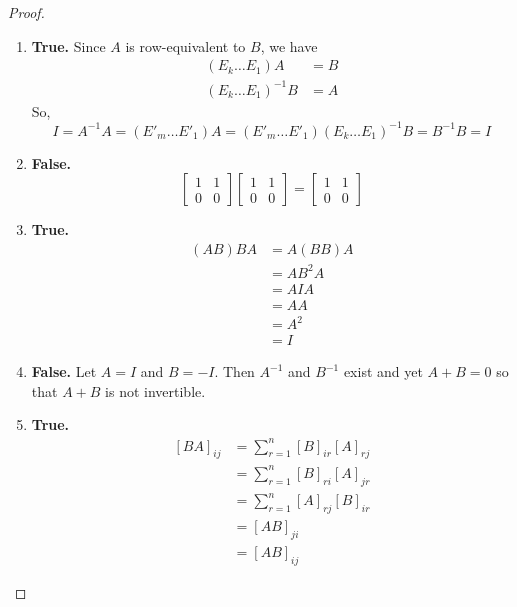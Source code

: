 \begin{exercise}
    \begin{proof}
        \begin{enumerate}
            \item \textbf{True.} Since \( A \) is row-equivalent to \( B \), we have
            \begin{align*}
                (E_k \ldots E_1)A &= B \\
                (E_k \ldots E_1)^{-1}B &= A
            \end{align*}
            So,
            \[ I = A^{-1}A = (E'_m \ldots E'_1)A = (E'_m \ldots E'_1)(E_k \ldots E_1)^{-1}B = B^{-1}B = I \]
            
            \item \textbf{False.}
            \[ \begin{bmatrix} 1 & 1 \\ 0 & 0 \end{bmatrix} \begin{bmatrix} 1 & 1 \\ 0 & 0 \end{bmatrix} = \begin{bmatrix} 1 & 1 \\ 0 & 0 \end{bmatrix}\]
            
            \item \textbf{True.}
            \begin{align*}
                (AB)BA &= A(BB)A \\
                &= AB^2A \\
                &= AIA \\
                &= AA \\
                &= A^2 \\
                &= I
            \end{align*}
            
            \item \textbf{False.} Let \( A = I \) and \( B = -I \). Then \( A^{-1} \) and \( B^{-1} \) exist and yet \( A + B = 0 \) so that \( A + B \) is not invertible.
            
            \item \textbf{True.}
            \begin{align*}
                \left[ BA \right]_{ij} &= \sum_{r=1}^n \left[ B \right]_{ir}\left[ A \right]_{rj} \\
                &= \sum_{r=1}^n \left[ B \right]_{ri}\left[ A \right]_{jr} \\
                &= \sum_{r=1}^n \left[ A \right]_{rj}\left[ B \right]_{ir} \\
                &= \left[ AB \right]_{ji} \\
                &= \left[ AB \right]_{ij}
            \end{align*}
            

\end{enumerate}
\end{proof}
\end{exercise}
